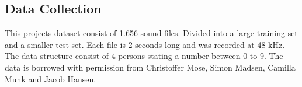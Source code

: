 \subsection*{Data Collection}

This projects dataset consist of 1.656 sound files. 
Divided into a large training set and a smaller test set. 
Each file is 2 seconds long and was recorded at 48 kHz.
The data structure consist of 4 persons stating a number between 0 to 9. 
The data is borrowed with permission from Christoffer Mose, Simon Madsen, Camilla Munk and Jacob Hansen.
  